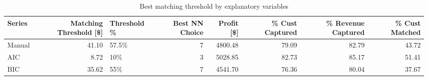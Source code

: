 \begin{table}[ht]
\centering
\caption{Best matching threshold by explanatory variables} 
\label{tab:series_max}
\begin{tabular}{lrlrrrrr}
  \hline
Series & Matching Threshold [\$] & Threshold \% & Best NN Choice & Profit [\$] & \% Cust Captured & \% Revenue Captured & \% Cust Matched \\ 
  \hline
Manual & 41.10 & 57.5\% &   7 & 4800.48 & 79.09 & 82.79 & 43.72 \\ 
  AIC & 8.72 & 10\% &   3 & 5028.85 & 82.73 & 85.17 & 51.41 \\ 
  BIC & 35.62 & 55\% &   7 & 4541.70 & 76.36 & 80.04 & 37.67 \\ 
   \hline
\end{tabular}
\end{table}
